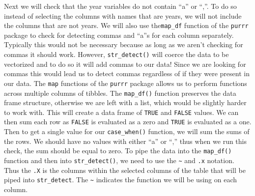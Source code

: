 \documentclass[
]{article}
\newenvironment{Shaded}{\begin{snugshade}}{\end{snugshade}}
\newcommand{\ControlFlowTok}[1]{\textcolor[rgb]{0.13,0.29,0.53}{\textbf{#1}}}
\newcommand{\DataTypeTok}[1]{\textcolor[rgb]{0.13,0.29,0.53}{#1}}
\newcommand{\DecValTok}[1]{\textcolor[rgb]{0.00,0.00,0.81}{#1}}
\newcommand{\FloatTok}[1]{\textcolor[rgb]{0.00,0.00,0.81}{#1}}
\newcommand{\KeywordTok}[1]{\textcolor[rgb]{0.13,0.29,0.53}{\textbf{#1}}}
\newcommand{\NormalTok}[1]{#1}
\newcommand{\OperatorTok}[1]{\textcolor[rgb]{0.81,0.36,0.00}{\textbf{#1}}}
\newcommand{\OtherTok}[1]{\textcolor[rgb]{0.56,0.35,0.01}{#1}}
\newcommand{\StringTok}[1]{\textcolor[rgb]{0.31,0.60,0.02}{#1}}
\begin{document}
Next we will check that the year variables do not contain ``a'' or
``,''. To do so instead of selecting the columns with names that are
years, we will not include the columns that are not years. We will also
use the\texttt{map\_df} function of the \texttt{purrr} package to check
for detecting commas and ``a''s for each column separately. Typically
this would not be necessary because as long as we aren't checking for
commas it should work. However, \texttt{str\_detect()} will coerce the
data to be vectorized and to do so it will add commas to our data! Since
we are looking for commas this would lead us to detect commas regardless
of if they were present in our data. The \texttt{map} functions of the
\texttt{purrr} package allows us to perform functions across multiple
columns of tibbles. The \texttt{map\_df()} function preserves the data
frame structure, otherwise we are left with a list, which would be
slightly harder to work with. This will create a data frame of
\texttt{TRUE} and \texttt{FALSE} values. We can then sum each row as
\texttt{FALSE} is evaluated as a zero and \texttt{TRUE} is evaluated as
a one. Then to get a single value for our \texttt{case\_when()}
function, we will sum the sums of the rows. We should have no values
with either ``a'' or ``,'' thus when we run this check, the sum should
be equal to zero. To pipe the data into the \texttt{map\_df()} function
and then into \texttt{str\_detect()}, we need to use the
\texttt{\textasciitilde{}} and \texttt{.x} notation. Thus the
\texttt{.X} is the columns within the selected columns of the table that
will be piped into \texttt{str\_detect}. The \texttt{\textasciitilde{}}
indicates the function we will be using on each column.

\begin{Shaded}
\end{Shaded}
\end{document}
